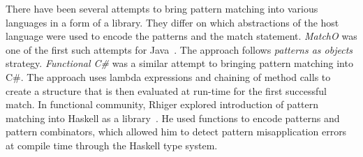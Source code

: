 There have been several attempts to bring pattern matching into various 
languages in a form of a library. They differ on which abstractions of the host 
language were used to encode the patterns and the match statement. \emph{MatchO} was one of the first 
such attempts for Java~\cite{Visser06matchingobjects}. The approach follows 
\emph{patterns as objects} strategy.
%
\emph{Functional C\#} was a similar attempt to bringing pattern matching into 
C\#\cite{FuncCSharp}. The approach uses lambda expressions and 
chaining of method calls to create a structure that is then evaluated at 
run-time for the first successful match. %
%
In functional community, Rhiger explored introduction of pattern 
matching into Haskell as a library~\cite{Rhiger09}. He used functions to encode 
patterns and pattern combinators, which allowed him to detect pattern 
misapplication errors at compile time through the Haskell type system. 
